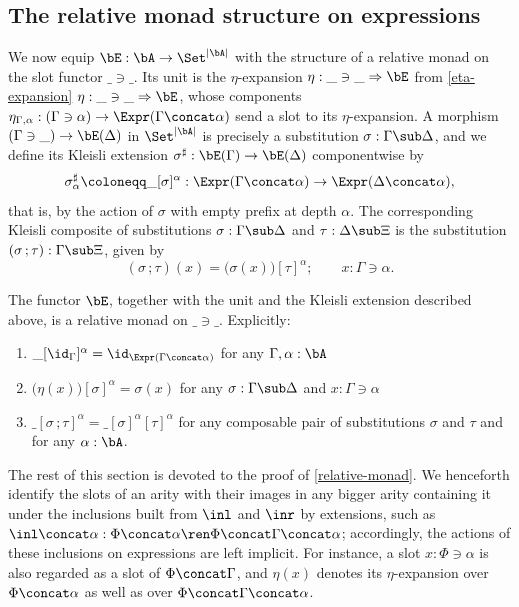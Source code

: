 \subsection{The relative monad structure on expressions}

We now equip $\bE : \bA \to \Set^{\left|\bA\right|}$ with the structure of a relative monad on the slot functor $\_ \ni \_$. Its unit is the $\eta$-expansion $\eta : \_ \ni \_ \Rightarrow \bE$ from \cref{eta-expansion} $\eta : \_ \ni \_ \Rightarrow \bE$, whose components $\eta_{\Gamma, \alpha} : (\Gamma \ni \alpha) \to \Expr(\Gamma \concat \alpha)$ send a slot to its $\eta$-expansion. A morphism $(\Gamma \ni \_) \to \bE(\Delta)$ in $\Set^{\left|\bA\right|}$ is precisely a substitution $\sigma : \Gamma \sub \Delta$, and we define its Kleisli extension $\sigma^\sharp : \bE(\Gamma) \to \bE(\Delta)$ componentwise by
\[
\sigma^\sharp_\alpha \coloneqq \_[\sigma]^\alpha : \Expr(\Gamma \concat \alpha) \to \Expr(\Delta \concat \alpha),
\]
that is, by the action of $\sigma$ with empty prefix at depth $\alpha$. The corresponding Kleisli composite of substitutions $\sigma : \Gamma \sub \Delta$ and $\tau : \Delta \sub \Xi$ is the substitution $(\sigma\,; \tau) : \Gamma \sub \Xi$, given by
\[
(\sigma\,; \tau)(x) = \big(\sigma(x)\big)[\tau]^\alpha; \qquad x : \Gamma \ni \alpha.
\]

\begin{theorem}\label{relative-monad}
    The functor $\bE$, together with the unit and the Kleisli extension described above, is a relative monad on $\_ \ni \_$. Explicitly:
    \begin{enumerate}
        \item $\_[\id_\Gamma]^\alpha = \id_{\Expr(\Gamma \concat \alpha)}$ for any $\Gamma, \alpha : \bA$
        \item $\big(\eta(x)\big)[\sigma]^\alpha = \sigma(x)$ for any $\sigma : \Gamma \sub \Delta$ and $x : \Gamma \ni \alpha$
        \item $\_[\sigma \,; \tau]^\alpha = \_[\sigma]^\alpha[\tau]^\alpha$ for any composable pair of substitutions $\sigma$ and $\tau$ and  for any $\alpha : \bA$.
    \end{enumerate}
\end{theorem}

The rest of this section is devoted to the proof of \cref{relative-monad}. We henceforth identify the slots of an arity with their images in any bigger arity containing it under the inclusions built from $\inl$ and $\inr$ by extensions, such as $\inl \concat \alpha : \Phi \concat \alpha \ren \Phi \concat \Gamma \concat \alpha$; accordingly, the actions of these inclusions on expressions are left implicit. For instance, a slot $x : \Phi \ni \alpha$ is also regarded as a slot of $\Phi \concat \Gamma$, and $\eta(x)$ denotes its $\eta$-expansion over $\Phi \concat \alpha$ as well as over $\Phi \concat \Gamma \concat \alpha$.

